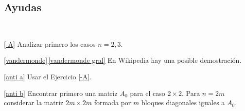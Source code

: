 \subsection*{Ayudas}

\

\ref{-A} Analizar primero los casos $n=2,3$.


\ref{vandermonde}\,\ref{vandermonde gral} En Wikipedia hay una posible demostración.


\ref{anti a} Usar el Ejercicio \ref{-A}.


\ref{anti b} Encontrar primero una matriz $A_0$ para el caso $2\times 2$. Para $n = 2m$ considerar la matriz $2m \times 2m$ formada por $m$ bloques diagonales iguales a $A_0$.

